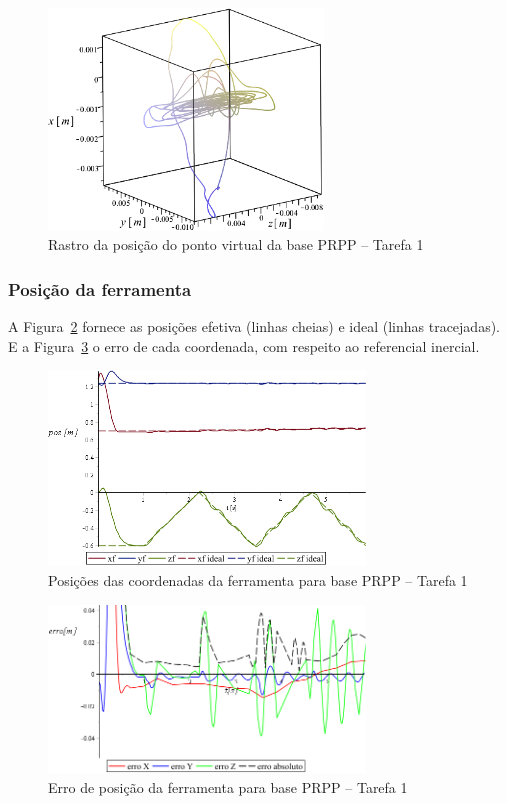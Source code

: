 \begin{figure}[h!]
	\centering 
 	\includegraphics[width=0.65\textwidth]{figs/t1_pvirtural_base_prpp}
 	\caption{Rastro da posição do ponto virtual da base PRPP -- Tarefa 1}
 	\label{fig::t1_pvirtural_base_prpp}
\end{figure}


\subsubsection{Posição da ferramenta}

A Figura~\ref{fig::t1_posf_base_prpp} fornece as posições efetiva (linhas cheias)
e ideal (linhas tracejadas). E a Figura~\ref{fig::t1_erroposf_base_prpp} o erro
de cada coordenada, com respeito ao referencial inercial.

\begin{figure}[h!]
	\centering 
 	\includegraphics[width=0.75\textwidth]{figs/t1_posf_base_prpp}
 	\caption{Posições das coordenadas da ferramenta para base PRPP -- Tarefa
 	1}
 	\label{fig::t1_posf_base_prpp}
\end{figure}

\begin{figure}[h!]
	\centering 
 	\includegraphics[width=0.75\textwidth]{figs/t1_erroposf_base_prpp}
 	\caption{Erro de posição da ferramenta para base PRPP -- Tarefa 1}
 	\label{fig::t1_erroposf_base_prpp}
\end{figure}

